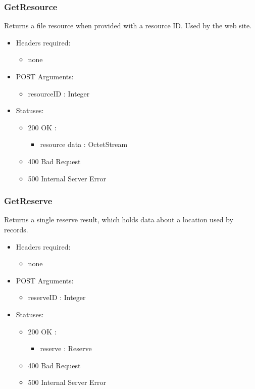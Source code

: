     \subsubsection{GetResource}
        Returns a file resource when provided with a resource ID. Used by the web site.
        \begin{itemize}
            \item Headers required:
            \begin{itemize}
                \item none
            \end{itemize}
            \item POST Arguments:
            \begin{itemize}
                \item resourceID : Integer
            \end{itemize}
            \item Statuses:
            \begin{itemize}
                \item 200 OK : 
                \begin{itemize}
                    \item resource data : OctetStream
                \end{itemize}
                \item 400 Bad Request
                \item 500 Internal Server Error
            \end{itemize}
        \end{itemize}

    \subsubsection{GetReserve}
        Returns a single reserve result, which holds data about a location used by records. 
        \begin{itemize}
            \item Headers required: 
            \begin{itemize}
                \item none
            \end{itemize}
            \item POST Arguments:
            \begin{itemize}
                \item reserveID : Integer
            \end{itemize}
            \item Statuses:
            \begin{itemize}
                \item 200 OK :
                \begin{itemize}
                    \item reserve : Reserve
                \end{itemize}
                \item 400 Bad Request
                \item 500 Internal Server Error
            \end{itemize}
        \end{itemize}       

